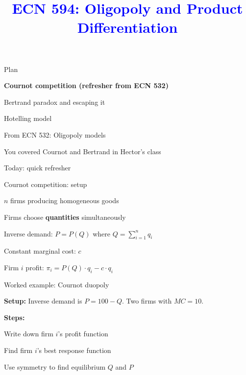 \documentclass[notes,11pt, aspectratio=169]{beamer}
\title[]{\textcolor{blue}{ECN 594: Oligopoly and Product Differentiation}}
\author[PGP]{}
\institute[FRBNY]{\small{\begin{tabular}{c c c}
Nicholas Vreugdenhil \\
\end{tabular}}}
\date{}
\newenvironment{wideitemize}{\itemize\addtolength{\itemsep}{10pt}}{\enditemize}
\newenvironment{wideenumerate}{\enumerate\addtolength{\itemsep}{10pt}}{\endenumerate}
\begin{document}
\begin{frame}
\maketitle
  \centering
\end{frame}

\begin{frame}{Plan}
  \begin{wideenumerate}
    \item \textbf{Cournot competition (refresher from ECN 532)}
    \item Bertrand paradox and escaping it
    \item Hotelling model
  \end{wideenumerate}
\end{frame}


\begin{frame}{From ECN 532: Oligopoly models}
	\begin{wideitemize}
		\item You covered Cournot and Bertrand in Hector's class
		\item Today: quick refresher
	\end{wideitemize}
\end{frame}

\begin{frame}{Cournot competition: setup}
	\begin{wideitemize}
		\item $n$ firms producing homogeneous goods
		\item Firms choose \textbf{quantities} simultaneously
		\item Inverse demand: $P = P(Q)$ where $Q = \sum_{i=1}^n q_i$
		\item Constant marginal cost: $c$
		\item Firm $i$ profit: $\pi_i = P(Q) \cdot q_i - c \cdot q_i$
	\end{wideitemize}
\end{frame}

\begin{frame}{Worked example: Cournot duopoly}
	\begin{wideitemize}
		\item \textbf{Setup:} Inverse demand is $P = 100 - Q$. Two firms with $MC = 10$.
		\item \textbf{Steps:}
		\begin{wideenumerate}
			\item Write down firm $i$'s profit function
			\item Find firm $i$'s best response function
			\item Use symmetry to find equilibrium $Q$ and $P$
		\end{wideenumerate}
	\end{wideitemize}
\end{frame}
\end{document}
